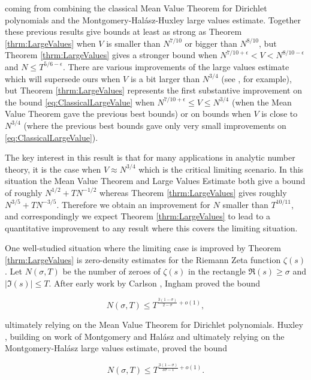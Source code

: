 \documentclass{amsart}
\theoremstyle{plain}
\numberwithin{equation}{section}
\begin{document}
coming from combining the classical Mean Value Theorem for Dirichlet polynomials and the Montgomery-Hal\'asz-Huxley large values estimate. Together these previous results give bounds at least as strong as Theorem \ref{thrm:LargeValues} when $V$ is smaller than $N^{7/10}$ or bigger than $N^{8/10}$, but Theorem \ref{thrm:LargeValues} gives a stronger bound when $N^{7/10+\epsilon}<V<N^{8/10-\epsilon}$ and $N\le T^{5/6-\epsilon}$. There are various improvements of the large values estimate which will supersede ours when $V$ is a bit larger than $N^{3/4}$ (see \cite[Chapter 11]{Iv}, for example), but Theorem \ref{thrm:LargeValues} represents the first substantive improvement on the bound \eqref{eq:ClassicalLargeValue} when $N^{7/10+\epsilon}\le V\le N^{3/4}$ (when the Mean Value Theorem gave the previous best bounds) or on bounds when $V$ is close to $N^{3/4}$ (where the previous best bounds gave only very small improvements on \eqref{eq:ClassicalLargeValue}).

The key interest in this result is that for many applications in analytic number theory, it is the case when $V\approx N^{3/4}$ which is the critical limiting scenario. In this situation the Mean Value Theorem and Large Values Estimate both give a bound of roughly $N^{1/2}+TN^{-1/2}$ whereas Theorem \ref{thrm:LargeValues} gives roughly $N^{3/5}+TN^{-3/5}$. Therefore we obtain an improvement for $N$ smaller than $T^{10/11}$, and correspondingly we expect Theorem \ref{thrm:LargeValues} to lead to a quantitative improvement to any result where this covers the limiting situation.

One well-studied situation where the limiting case is  improved by Theorem \ref{thrm:LargeValues} is zero-density estimates for the Riemann Zeta function $\zeta(s)$. Let $N(\sigma,  T)$ be the number of zeroes of $\zeta(s)$ in the rectangle $\Re(s) \ge \sigma$ and $|\Im(s) | \le T$.      After early work by Carlson \cite{Ca},  Ingham \cite{I} proved the bound 

\begin{equation}
N(\sigma,  T) \le T^{\frac{3 (1 - \sigma)}{2 - \sigma} + o(1)},
\label{eq:Ingham}
\end{equation}

ultimately relying on the Mean Value Theorem for Dirichlet polynomials. Huxley \cite{Hu},  building on work of Montgomery \cite{M3} and Hal\'asz \cite{H} and ultimately relying on the Montgomery-Hal\'asz large values estimate, proved the bound

\begin{equation}
 N(\sigma, T) \le T^{\frac{3(1 - \sigma)}{3 \sigma - 1} + o(1)}. 
\label{eq:Huxley}
\end{equation}
\end{document}
